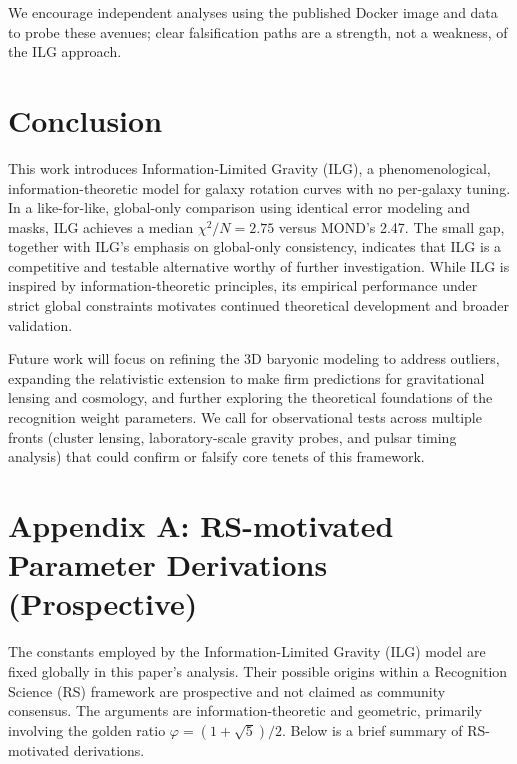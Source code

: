 \documentclass[usenatbib]{mnras}
\begin{document}
We encourage independent analyses using the published Docker image and data to probe these avenues; clear falsification paths are a strength, not a weakness, of the ILG approach.

\section{Conclusion}

This work introduces Information-Limited Gravity (ILG), a phenomenological, information-theoretic model for galaxy rotation curves with no per-galaxy tuning. In a like-for-like, global-only comparison using identical error modeling and masks, ILG achieves a median $\chi^2/N = 2.75$ versus MOND's 2.47. The small gap, together with ILG's emphasis on global-only consistency, indicates that ILG is a competitive and testable alternative worthy of further investigation.
While ILG is inspired by information-theoretic principles, its empirical performance under strict global constraints motivates continued theoretical development and broader validation.

Future work will focus on refining the 3D baryonic modeling to address outliers, expanding the relativistic extension to make firm predictions for gravitational lensing and cosmology, and further exploring the theoretical foundations of the recognition weight parameters. We call for observational tests across multiple fronts (cluster lensing, laboratory-scale gravity probes, and pulsar timing analysis) that could confirm or falsify core tenets of this framework.

\appendix
\section*{Appendix A: RS-motivated Parameter Derivations (Prospective)}

The constants employed by the Information-Limited Gravity (ILG) model are fixed globally in this paper's analysis. Their possible origins within a Recognition Science (RS) framework are prospective and not claimed as community consensus. The arguments are information-theoretic and geometric, primarily involving the golden ratio $\varphi = (1+\sqrt{5})/2$. Below is a brief summary of RS-motivated derivations.
\end{document}
